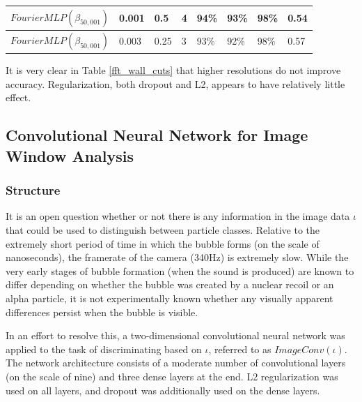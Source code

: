 \documentclass[10pt]{article}
\begin{document}
\begin{minipage}{\textwidth}
\begin{center}
\begin{tabular}{|l|l|l|l|l|l|l|l|}
            \hline
            $FourierMLP(\beta_{50,001})$ & 0.001 & 0.5 & 4 & 94\% & 93\% & 98\% & 0.54 \\
            \hline
            $FourierMLP(\beta_{50,001})$ & 0.003 & 0.25 & 3 & 93\% & 92\% & 98\% & 0.57 \\
            \hline
        \end{tabular}
    \end{center}
\end{minipage}

It is very clear in Table \ref{fft_wall_cuts} that higher resolutions do not improve accuracy. Regularization, both dropout and L2, appears to have relatively little effect.

\subsection{Convolutional Neural Network for Image Window Analysis}

\subsubsection{Structure}

It is an open question whether or not there is any information in the image data $\iota$ that could be used to distinguish between particle classes. Relative to the extremely short period of time in which the bubble forms (on the scale of nanoseconds), the framerate of the camera (340Hz) is extremely slow. While the very early stages of bubble formation (when the sound is produced) are known to differ depending on whether the bubble was created by a nuclear recoil or an alpha particle, it is not experimentally known whether any visually apparent differences persist when the bubble is visible.

In an effort to resolve this, a two-dimensional convolutional neural network was applied to the task of discriminating based on $\iota$, referred to as $ImageConv(\iota)$. The network architecture consists of a moderate number of convolutional layers (on the scale of nine) and three dense layers at the end. L2 regularization was used on all layers, and dropout was additionally used on the dense layers.
\end{document}
